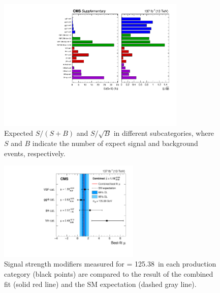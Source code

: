 \begin{figure}[!htb]
    \centering
    \includegraphics[width=0.80\textwidth]{pics/results/purity_signif.pdf}
    \caption{Expected $S/(S+B)$ and $S/\sqrt{B}$ in different subcategories, 
             where $S$ and $B$ indicate the number of expect signal and background events, respectively.}
    \label{fig:sum_cats_SB}
\end{figure}


\begin{figure}[!htb]
    \centering
    \includegraphics[width=0.60\textwidth]{pics/results/sig_strength.pdf}
    \caption{Signal strength modifiers measured for \mh = 125.38~\GeV in each production category (black points) 
             are compared to the result of the combined fit (solid red line) and the SM expectation (dashed gray line).}
    \label{fig:sum_sig_strength}
\end{figure}

